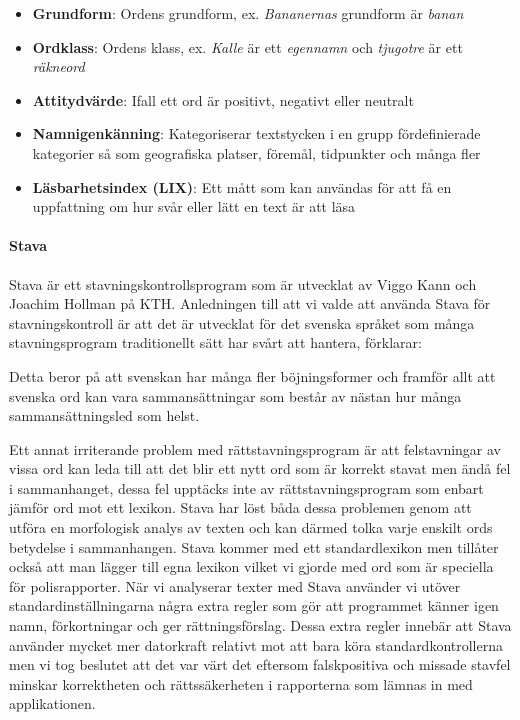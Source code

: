 \documentclass[swedish]{maucsthesis}
\begin{document}
\begin{itemize}
\item \textbf{Grundform}: Ordens grundform, ex. \textit{Bananernas} grundform är
  \textit{banan}
\item \textbf{Ordklass}: Ordens klass, ex. \textit{Kalle} är ett
  \textit{egennamn} och \textit{tjugotre} är ett \textit{räkneord}
\item \textbf{Attitydvärde}: Ifall ett ord är positivt, negativt eller neutralt
\item \textbf{Namnigenkänning}: Kategoriserar textstycken i en grupp
  fördefinierade kategorier så som geografiska platser, föremål, tidpunkter och
  många fler
\item \textbf{Läsbarhetsindex (LIX)}: Ett mått som kan användas för att få en
  uppfattning om hur svår eller lätt en text är att läsa
\end{itemize}

\paragraph*{Stava}
Stava är ett stavningskontrollsprogram som är utvecklat av Viggo Kann och
Joachim Hollman på KTH. Anledningen till att vi valde att använda Stava för
stavningskontroll är att det är utvecklat för det svenska språket som många
stavningsprogram traditionellt sätt har svårt att hantera, \cite{kann:1997}
förklarar:

\begin{displayquote}
  Detta beror på att svenskan har många fler böjningsformer och framför allt att
  svenska ord kan vara sammansättningar som består av nästan hur många
  sammansättningsled som helst.
\end{displayquote}

Ett annat irriterande problem med rättstavningsprogram är att felstavningar av
vissa ord kan leda till att det blir ett nytt ord som är korrekt stavat men ändå
fel i sammanhanget, dessa fel upptäcks inte av rättstavningsprogram som enbart
jämför ord mot ett lexikon. Stava har löst båda dessa problemen genom att utföra
en morfologisk analys av texten och kan därmed tolka varje enskilt ords
betydelse i sammanhangen. Stava kommer med ett standardlexikon men tillåter
också att man lägger till egna lexikon vilket vi gjorde med ord som är speciella
för polisrapporter. När vi analyserar texter med Stava använder vi utöver
standardinställningarna några extra regler som gör att programmet känner igen
namn, förkortningar och ger rättningsförslag. Dessa extra regler innebär att
Stava använder mycket mer datorkraft relativt mot att bara köra
standardkontrollerna men vi tog beslutet att det var värt det eftersom
falskpositiva och missade stavfel minskar korrektheten och rättssäkerheten i
rapporterna som lämnas in med applikationen.
\end{document}
